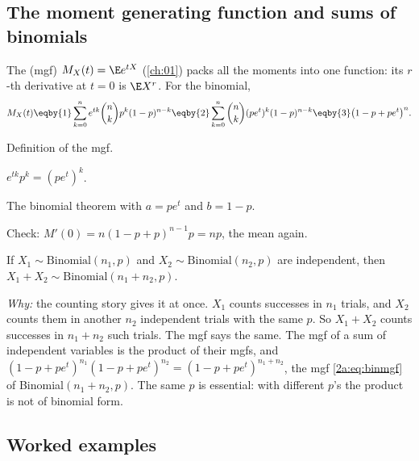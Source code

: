 \subsection{The moment generating function and sums of binomials}

The  (mgf) $M_X(t)=\E e^{tX}$ (\cref{ch:01}) packs all the moments into one function: its $r$-th derivative at $t=0$ is $\E X^r$. For the binomial,
\begin{align}
  M_X(t) \eqby{1} \sum_{k=0}^n e^{tk}\binom nk p^k(1-p)^{n-k}
  \eqby{2} \sum_{k=0}^n\binom nk (pe^t)^k(1-p)^{n-k}
  \eqby{3} \bigl(1-p+pe^t\bigr)^n . \label{2a:eq:binmgf}
\end{align}
\begin{explain}
  \item Definition of the mgf.
  \item $e^{tk}p^k=(pe^t)^k$.
  \item The binomial theorem with $a=pe^t$ and $b=1-p$.
\end{explain}
Check: $M'(0)=n(1-p+p)^{n-1}p=np$, the mean again.

\begin{keyidea}
If $X_1\sim\mathrm{Binomial}(n_1,p)$ and $X_2\sim\mathrm{Binomial}(n_2,p)$ are independent, then $X_1+X_2\sim\mathrm{Binomial}(n_1+n_2,p)$.
\end{keyidea}
\emph{Why:} the counting story gives it at once. $X_1$ counts successes in $n_1$ trials, and $X_2$ counts them in another $n_2$ independent trials with the same $p$. So $X_1+X_2$ counts successes in $n_1+n_2$ such trials. The mgf says the same. The mgf of a sum of independent variables is the product of their mgfs, and $(1-p+pe^t)^{n_1}(1-p+pe^t)^{n_2}=(1-p+pe^t)^{n_1+n_2}$, the mgf \eqref{2a:eq:binmgf} of Binomial$(n_1+n_2,p)$. The same $p$ is essential: with different $p$'s the product is not of binomial form.

\subsection{Worked examples}

